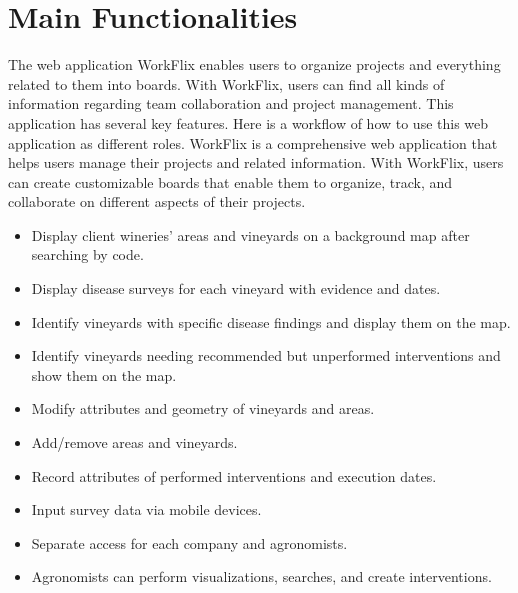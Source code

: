 \section{Main Functionalities}

The web application WorkFlix enables users to organize projects and everything related to them into boards.
With WorkFlix, users can find all kinds of information regarding team collaboration and project management.
This application has several key features. Here is a workflow of how to use this web application as different roles.
WorkFlix is a comprehensive web application that helps users manage their projects and related information. With WorkFlix, users can create customizable boards that enable them to organize, track, and collaborate on different aspects of their projects.



\begin{itemize}
    \item Display client wineries' areas and vineyards on a background map after searching by code.
    \item Display disease surveys for each vineyard with evidence and dates.
    \item Identify vineyards with specific disease findings and display them on the map.
    \item Identify vineyards needing recommended but unperformed interventions and show them on the map.
    \item Modify attributes and geometry of vineyards and areas.
    \item Add/remove areas and vineyards.
    \item Record attributes of performed interventions and execution dates.
    \item Input survey data via mobile devices.
    \item Separate access for each company and agronomists.
    \item Agronomists can perform visualizations, searches, and create interventions.
\end{itemize}

